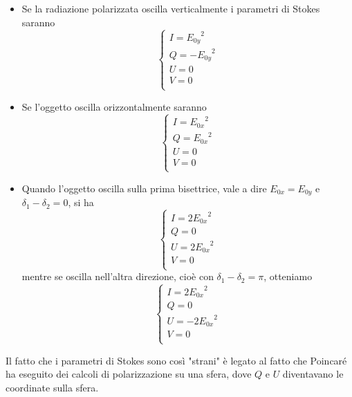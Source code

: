 \begin{itemize}
  \item Se la radiazione polarizzata oscilla verticalmente i parametri di Stokes saranno
  $$\begin{cases}
    I={E_{0y}}^2\\
    Q=-{E_{0y}}^2\\
    U=0\\
    V=0\\
  \end{cases}$$
  \item Se l'oggetto oscilla orizzontalmente saranno
  $$\begin{cases}
    I={E_{0x}}^2\\
    Q={E_{0x}}^2\\
    U=0\\
    V=0\\
  \end{cases}$$
  \item Quando l'oggetto oscilla sulla prima bisettrice, vale a dire $E_{0x}=E_{0y}$ e $\delta_1 -\delta_2=0$, si ha 
  $$\begin{cases}
    I=2{E_{0x}}^2\\
    Q=0\\
    U=2{E_{0x}}^2\\
    V=0\\
  \end{cases}$$
  mentre se oscilla nell'altra direzione, cioè con $\delta_1 -\delta_2=\pi$, otteniamo
  $$\begin{cases}
    I=2{E_{0x}}^2\\
    Q=0\\
    U=-2{E_{0x}}^2\\
    V=0\\
  \end{cases}$$
\end{itemize}

Il fatto che i parametri di Stokes sono così "strani" è legato al fatto che Poincaré ha eseguito dei calcoli di polarizzazione su una sfera, dove $Q$ e $U$ diventavano le coordinate sulla sfera.